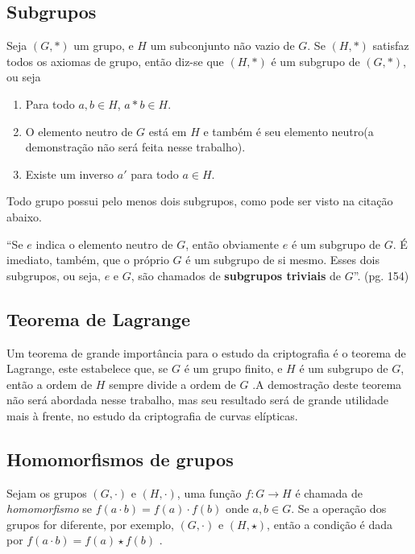 \subsection{Subgrupos}
Seja $(G, *)$ um grupo, e \(H\) um subconjunto não vazio de \(G\). Se $(H, *)$ satisfaz todos os axiomas de grupo, então diz-se que $(H, *)$ é um subgrupo de $(G, *)$\cite{Coutinho:2014}, ou seja

\begin{enumerate}
\item Para todo $a, b \in H$, $a * b \in H$.
\item O elemento neutro de \(G\) está em \(H\) e também é seu elemento neutro(a demonstração não será feita nesse trabalho).
\item Existe um inverso \(a'\) para todo $a \in H$.
\end{enumerate}

Todo grupo possui pelo menos dois subgrupos, como pode ser visto na citação abaixo.


\begin{citacao}
``Se \(e\) indica o elemento neutro de \(G\), então obviamente \(e\) é um subgrupo de \(G\). É imediato, também, que o próprio \(G\) é um subgrupo de si mesmo. Esses dois subgrupos, ou seja, \(e\) e \(G\), são chamados de \textbf{subgrupos triviais} de \(G\)''. \cite{Domingues:2003} (pg. 154)
\end{citacao}

\subsection{Teorema de Lagrange}

Um teorema de grande importância para o estudo da criptografia é o teorema de Lagrange, este estabelece que, se $G$ é um grupo finito, e $H$ é um subgrupo de $G$, então a ordem de $H$ sempre divide a ordem de $G$ \cite{Shoup:2005}.A demostração deste teorema não será abordada nesse trabalho, mas seu resultado será de grande utilidade mais à frente, no estudo da criptografia de curvas elípticas.

\subsection{Homomorfismos de grupos}

Sejam os grupos $(G, \cdot)$ e $(H, \cdot)$, uma função $f: G \rightarrow H$ é chamada de \textit{homomorfismo} se $f(a \cdot b) = f(a) \cdot f(b)$ onde $a, b \in G$. Se a operação dos grupos for diferente, por exemplo, $(G, \cdot)$ e $(H, \star)$, então a condição é dada por $f(a \cdot b) = f(a) \star f(b)$ \cite{Gilbert:2004}.

